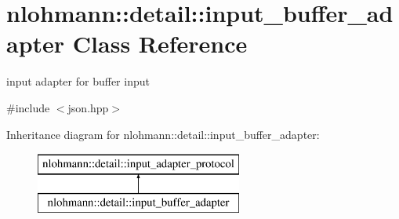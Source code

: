 \hypertarget{classnlohmann_1_1detail_1_1input__buffer__adapter}{}\section{nlohmann\+:\+:detail\+:\+:input\+\_\+buffer\+\_\+adapter Class Reference}
\label{classnlohmann_1_1detail_1_1input__buffer__adapter}


input adapter for buffer input  




{\ttfamily \#include $<$json.\+hpp$>$}

Inheritance diagram for nlohmann\+:\+:detail\+:\+:input\+\_\+buffer\+\_\+adapter\+:\begin{figure}[H]
\begin{center}
\leavevmode
\includegraphics[height=2.000000cm]{classnlohmann_1_1detail_1_1input__buffer__adapter}
\end{center}
\end{figure}
